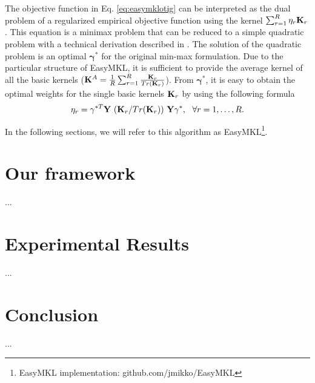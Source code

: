 \documentclass{esannV2}
\newcommand{\yy}{{\bf y}}
\newcommand{\KK}{{\bf K}}
\newcommand{\YY}{{\bf Y}}
\newcommand{\XX}{{\bf X}}
\newcommand{\1}{{\bf 1}}
\newcommand{\ggamma}{\pmb{\gamma}}
\begin{document}
The objective function in Eq. \ref{eq:easymklotig} can be interpreted as the dual problem of a regularized empirical objective function using the kernel $\sum_{r=1}^R \eta_r \KK_r$. This equation is a minimax problem that can be reduced  to a simple quadratic problem with a technical derivation described  in \cite{Aiolli2015}. The solution of the quadratic problem is an optimal $\ggamma^*$ for the original min-max formulation. Due to the particular structure of EasyMKL, it is sufficient to provide the average kernel of all the basic kernels ($\KK^A = \frac{1}{R} \sum_{r=1}^R \frac{\KK_r}{Tr(\KK_r)}$). From $\ggamma^*$, it is easy to obtain the optimal weights for the single basic kernels $\KK_r$ by using the following formula
\begin{equation}
\label{eq:easyeta}
	\eta_r = \gamma^{*T} \YY \,\, (\KK_r/Tr(\KK_r)) \,\, \YY \gamma^*, \,\,\,\, \forall r=1,\dots,R.
\end{equation}

In the following sections, we will refer to this algorithm as EasyMKL\footnote{EasyMKL implementation: github.com/jmikko/EasyMKL}.


\section{Our framework}
...

\section{Experimental Results}
...

\section{Conclusion}
...


\begin{footnotesize}







\end{footnotesize}

\end{document}
